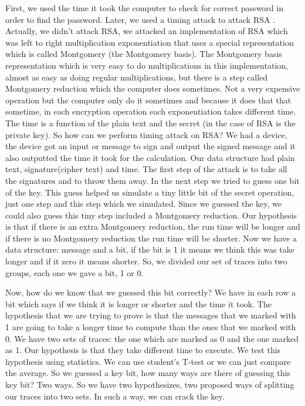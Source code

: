 First, we used the time it took the computer to check for correct password in
order to find the password. Later, we used a timing attack \cite{TimingAttack} to attack RSA \cite{rivest1978method}.
Actually, we didn't attack RSA, we attacked an implementation of RSA which was
left to right multiplication exponentiation that uses a special representation
which is called Montgomery (the Montgomery basis). The Montgomery basis \cite{Montgomery}
representation which is very easy to do multiplications in this implementation,
almost as easy as doing regular multiplications, but there is a step called
Montgomery reduction which the computer does sometimes. Not a very expensive
operation but the computer only do it sometimes and because it does that that
sometime, in each encryption operation each exponentiation takes different time.
The time is a function of the plain text and the secret (in the case of RSA is
the private key). So how can we perform timing attack on RSA? We had a device,
the device got an input or message to sign and output the signed message and it
also outputted the time it took for the calculation. Our data structure had
plain text, signature(cipher text) and time.  The first step of the attack is to
take all the signatures and to throw them away. In the next step we tried to
guess one bit of the key. This guess helped us simulate a tiny little bit of the
secret operation, just one step and this step which we simulated. Since we
guessed the key, we could also guess this tiny step included a Montgomery
reduction. Our hypothesis is that if there is an extra Montgomery reduction, the
run time will be longer and if there is no Montgomery reduction the run time
will be shorter. Now we have a data structure: message and a bit, if the bit is
1 it means we think this was take longer and if it zero it means shorter. So, we
divided our set of traces into two groups, each one we gave a bit, 1 or 0. 

Now, how do we know that we guessed this bit correctly? We have in each row a
bit which says if we think it is longer or shorter and the time it took. The
hypothesis that we are trying to prove is that the messages that we marked with
1 are going to take a longer time to compute than the ones that we marked with
0. We have two sets of traces: the one which are marked as 0 and the one marked
as 1. Our hypothesis is that they take different time to execute. We test this
hypothesis using statistics. We can use student's T-test or we can just compare
the average. So we guessed a key bit, how many ways are there of guessing this
key bit? Two ways. So we have two hypothesizes, two proposed ways of splitting
our traces into two sets. In such a way, we can crack the key.

